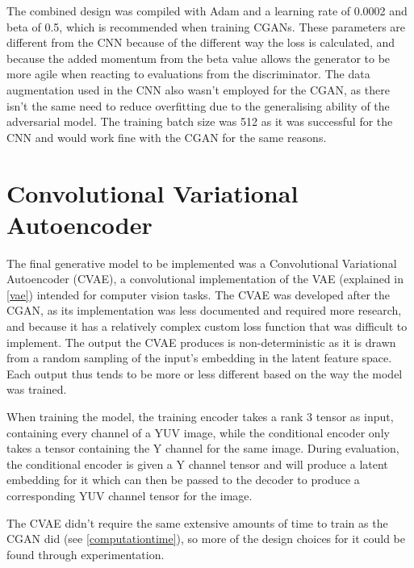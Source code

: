 \documentclass{l4proj}
\begin{document}
The combined design was compiled with Adam and a learning rate of 0.0002 and beta of 0.5, which is recommended when training CGANs\cite{GANTips}. These parameters are different from the CNN because of the different way the loss is calculated, and because the added momentum from the beta value allows the generator to be more agile when reacting to evaluations from the discriminator. The data augmentation used in the CNN also wasn't employed for the CGAN, as there isn't the same need to reduce overfitting due to the generalising ability of the adversarial model. The training batch size was 512 as it was successful for the CNN and would work fine with the CGAN for the same reasons.



\section{Convolutional Variational Autoencoder}
\label{vae-implementation}
The final generative model to be implemented was a Convolutional Variational Autoencoder (CVAE), a convolutional implementation of the VAE (explained in \ref{vae}) intended for computer vision tasks. The CVAE was developed after the CGAN, as its implementation was less documented and required more research, and because it has a relatively complex custom loss function that was difficult to implement. The output the CVAE produces is non-deterministic as it is drawn from a random sampling of the input's embedding in the latent feature space. Each output thus tends to be more or less different based on the way the model was trained.

When training the model, the training encoder takes a rank 3 tensor as input, containing every channel of a YUV image, while the conditional encoder only takes a tensor containing the Y channel for the same image. During evaluation, the conditional encoder is given a Y channel tensor and will produce a latent embedding for it which can then be passed to the decoder to produce a corresponding YUV channel tensor for the image.

The CVAE didn't require the same extensive amounts of time to train as the CGAN did (see \ref{computationtime}), so more of the design choices for it could be found through experimentation.
\end{document}
